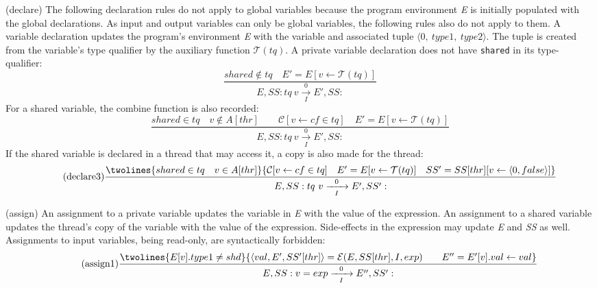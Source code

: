 \noindent (declare) The following declaration rules do not apply to global 
variables because the program environment \emph{E} is initially
populated with the global declarations. As input and output variables 
can only be global variables, the following rules also do not apply 
to them. A variable declaration updates the program's environment \emph{E}
with the variable and associated tuple $\langle 0,~type1,~type2 \rangle$.
The tuple is created from the variable's type qualifier by the auxiliary 
function $\mathcal{T}(tq)$. A private variable declaration does not have
\verb$shared$ in its type-qualifier:
\begin{equation*}
	\tag{declare1}
	\label{forec:declare1}
	\frac{
			shared \notin tq
			\quad
			E' = E[v \gets \mathcal{T}(tq)]
		}{
			E, SS: tq~v 
				\xrightarrow[~~I~~]{0} 
			E', SS: 
		}
\end{equation*}
For a shared variable, the combine function is also recorded:
\begin{equation*}
	\tag{declare2}
	\label{forec:declare2}
	\frac{
			shared \in tq
			\quad
			v \notin A[thr]
			\qquad
			\mathcal{C}[v \gets cf \in tq]
			\quad
			E' = E[v \gets \mathcal{T}(tq)]
		}{
			E, SS: tq~v 
				\xrightarrow[~~I~~]{0} 
			E', SS: 
		}
\end{equation*}
If the shared variable is declared in a thread that may access it, 
a copy is also made for the thread:
\begin{equation*}
	\tag{declare3}
	\label{forec:declare3}
	\frac{
		\twolines{
				shared \in tq
				\quad
				v \in A[thr]
			}{
				\mathcal{C}[v \gets cf \in tq]
				\quad
				E' = E[v \gets \mathcal{T}(tq)]
				\quad
				SS' = SS[thr][v \gets \langle 0, false \rangle]
			}
		}{
			E, SS: tq~v 
				\xrightarrow[~~I~~]{0} 
			E', SS': 
		}
\end{equation*}

\noindent (assign) An assignment to a private variable updates the 
variable in \emph{E} with the value of the expression. An assignment 
to a shared variable updates the thread's copy of the variable with 
the value of the expression. Side-effects in the expression may update 
\emph{E} and \emph{SS} as well. Assignments to input 
variables, being read-only, are syntactically forbidden:
\begin{equation*}
	\tag{assign1}
	\label{forec:assign1}
	\frac{
		\twolines{
				E[v].type1 \neq shd
			}{
				\langle val, E', SS'[thr] \rangle = \mathcal{E}(E, SS[thr], I, exp)
				\qquad
				E'' = E'[v].val \gets val
			}
		}{
			E, SS: v = exp 
				\xrightarrow[~~I~~]{0} 
			E'', SS': 
		}
\end{equation*}


